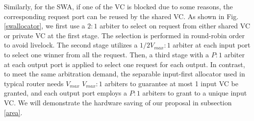 \documentclass[10pt,conference]{IEEEtran}
\begin{document}
Similarly, for the SWA, if one of the VC is blocked due to some reasons, the corresponding request port can be reused by the shared VC. As shown in Fig. \ref{swallocator}, we first use a $2:1$ arbiter to select on request from either shared VC or private VC at the first stage. The selection is performed in round-robin order to avoid livelock. The second stage utilizes a $1/2V_{max}:1$ arbiter at each input port to select one winner from all the request. Then, a third stage with a $P:1$ arbiter at each output port is applied to select one request for each output. In contrast, to meet the same arbitration demand, the separable input-first allocator used in typical router needs $V_{max}$ $V_{max}:1$ arbiters to guarantee at most 1 input VC be granted, and each output port employs a $P:1$ arbiters to grant to a unique input VC. We will demonstrate the hardware saving of our proposal in subsection \ref{area}.

\end{document}

